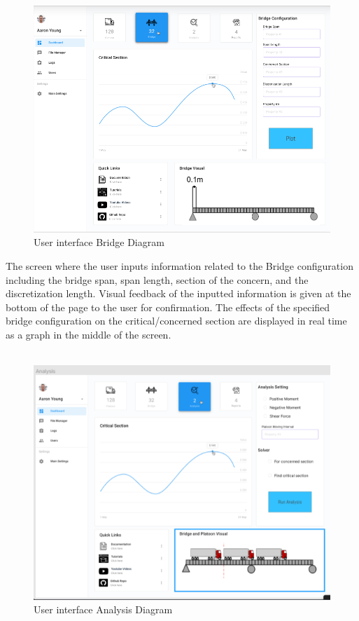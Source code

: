 \documentclass[12pt, titlepage]{article}
\begin{document}
\begin{figure}[H]
  \centering
  \includegraphics[width=1\textwidth]{../images/Userinterface-Bridge.PNG}
  \caption{User interface Bridge Diagram}
  \label{fig:userinterface-bridge-diagram}
\end{figure}
The screen where the user inputs information related to the Bridge configuration including the bridge span, span length, section of the concern, and the discretization length. Visual feedback of the inputted information is given at the bottom of the page to the user for confirmation. The effects of the specified bridge configuration on the critical/concerned section are displayed in real time as a graph in the middle of the screen.\\\\
\begin{figure}[H]
  \centering
  \includegraphics[width=1\textwidth]{../images/Userinterface-Analysis.PNG}
  \caption{User interface Analysis Diagram}
  \label{fig:userinterface-analysis-diagram}
\end{figure}
\end{document}
